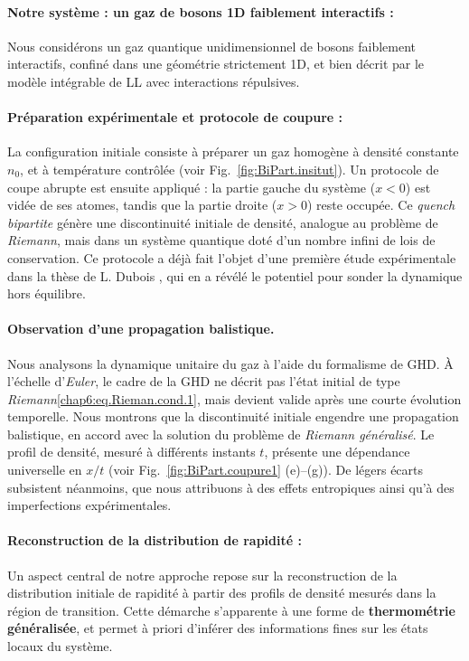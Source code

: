 \paragraph*{Notre système : un gaz de bosons 1D faiblement interactifs :}
Nous considérons un gaz quantique unidimensionnel de bosons faiblement interactifs, confiné dans une géométrie strictement 1D, et bien décrit par le modèle intégrable de \gls{LL} avec interactions répulsives. %

\paragraph*{Préparation expérimentale et protocole de coupure :}
La configuration initiale consiste à préparer un gaz homogène à densité constante $n_0$, et à température contrôlée (voir Fig.~\ref{fig:BiPart.insitut}). Un protocole de coupe abrupte est ensuite appliqué : la partie gauche du système ($x<0$) est vidée de ses atomes, tandis que la partie droite ($x>0$) reste occupée. Ce \emph{quench bipartite} génère une discontinuité initiale de densité, analogue au problème de \emph{Riemann}, mais dans un système quantique doté d’un nombre infini de lois de conservation. Ce protocole a déjà fait l’objet d’une première étude expérimentale dans la thèse de L. Dubois \cite{L.Dubois2024}, qui en a révélé le potentiel pour sonder la dynamique hors équilibre.

\paragraph*{Observation d’une propagation balistique.}
Nous analysons la dynamique unitaire du gaz à l’aide du formalisme de \gls{GHD}.  
À l’échelle d’\emph{Euler}, le cadre de la \gls{GHD} ne décrit pas l’état initial de type \emph{Riemann}\eqref{chap6:eq.Rieman.cond.1}, mais devient valide après une courte évolution temporelle.  
Nous montrons que la discontinuité initiale engendre une propagation balistique, en accord avec la solution du problème de \emph{Riemann généralisé}.  
Le profil de densité, mesuré à différents instants $t$, présente une dépendance universelle en $x/t$ (voir Fig.~\ref{fig:BiPart.coupure1} (e)--(g)).  
De légers écarts subsistent néanmoins, que nous attribuons à des effets entropiques ainsi qu’à des imperfections expérimentales.


\paragraph*{Reconstruction de la distribution de rapidité :}
Un aspect central de notre approche repose sur la reconstruction de la distribution initiale de rapidité à partir des profils de densité mesurés dans la région de transition. Cette démarche s’apparente à une forme de {\bf thermométrie généralisée}, et permet à priori d’inférer des informations fines sur les états locaux du système.

